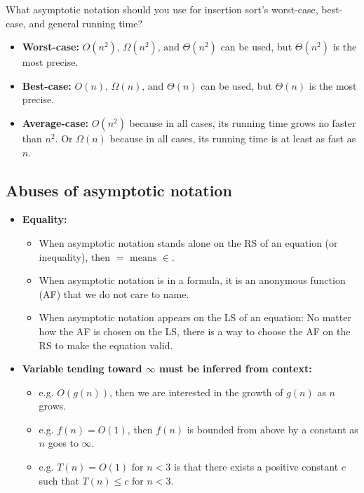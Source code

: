     \begin{example}
        What asymptotic notation should you use for insertion sort's worst-case, best-case, and general running time? 
        \vspace{1em}

        \begin{itemize}
            \item \textbf{Worst-case:} $O(n^2)\text{, } \Omega(n^2)\text{, and } \Theta(n^2)$ can be used, but $\Theta(n^2)$ is the most precise. 
            \item \textbf{Best-case:} $O(n)\text{, } \Omega(n)\text{, and } \Theta(n)$ can be used, but $\Theta(n)$ is the most precise. 
            \item \textbf{Average-case:} $O(n^2)$ because in all cases, its running time grows no faster than $n^2$. Or $\Omega(n)$ because in all cases, its running time is at least as fast as $n$.
        \end{itemize}
    \end{example}

\subsection{Abuses of asymptotic notation}
    \begin{intuition}
        \begin{itemize}
            \item \textbf{Equality:}
            \begin{itemize}
                \item When asymptotic notation stands alone on the RS of an equation (or inequality), then $= \text{ means } \in$.
                \item When asymptotic notation is in a formula, it is an anonymous function (AF) that we do not care to name.
                \item When asymptotic notation appears on the LS of an equation: No matter how the AF is chosen on the LS, there is a way to choose the AF on the RS to make the equation valid.
            \end{itemize}
            \item \textbf{Variable tending toward $\infty$ must be inferred from context:}
            \begin{itemize}
                \item e.g. $O(g(n))$, then we are interested in the growth of $g(n)$ as $n$ grows.
                \item e.g. $f(n) = O(1)$, then $f(n)$ is bounded from above by a constant as $n$ goes to $\infty$.
                \item e.g. $T(n) = O(1) \text{ for } n<3$ is that there exists a positive constant $c$ such that $T(n) \leq c \text{ for } n<3$.
            \end{itemize}
        \end{itemize}
    \end{intuition}

